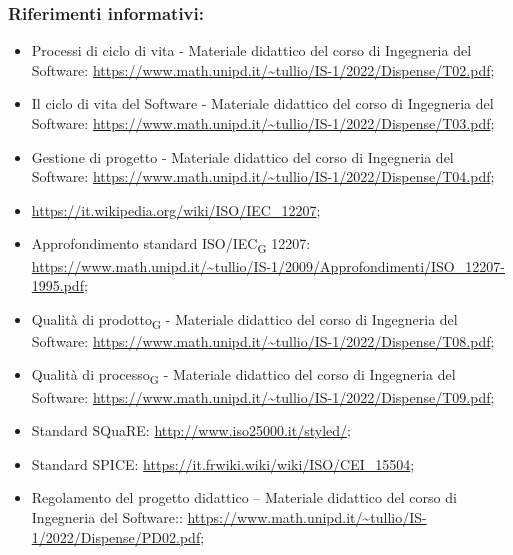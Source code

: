\subsubsection{Riferimenti informativi:}\:
\begin{itemize}
	\item Processi di ciclo di vita - Materiale didattico del corso di Ingegneria del Software: \url{https://www.math.unipd.it/~tullio/IS-1/2022/Dispense/T02.pdf};
	\item Il ciclo di vita del Software - Materiale didattico del corso di Ingegneria del Software: \url{https://www.math.unipd.it/~tullio/IS-1/2022/Dispense/T03.pdf};
	\item Gestione di progetto - Materiale didattico del corso di Ingegneria del Software: \url{https://www.math.unipd.it/~tullio/IS-1/2022/Dispense/T04.pdf};
	\item \url{https://it.wikipedia.org/wiki/ISO/IEC_12207};
	\item Approfondimento standard ISO/IEC\textsubscript{G} 12207:  \url{https://www.math.unipd.it/~tullio/IS-1/2009/Approfondimenti/ISO_12207-1995.pdf};
	\item Qualità di prodotto\textsubscript{G} - Materiale didattico del corso di Ingegneria del Software: \url{https://www.math.unipd.it/~tullio/IS-1/2022/Dispense/T08.pdf};
	\item Qualità di processo\textsubscript{G} - Materiale didattico del corso di Ingegneria del Software: \url{https://www.math.unipd.it/~tullio/IS-1/2022/Dispense/T09.pdf};
	\item Standard SQuaRE: \url{http://www.iso25000.it/styled/};
	\item Standard SPICE: \url{https://it.frwiki.wiki/wiki/ISO/CEI_15504};
	\item Regolamento del progetto didattico – Materiale didattico del corso di Ingegneria del Software::
	\url{https://www.math.unipd.it/~tullio/IS-1/2022/Dispense/PD02.pdf};
\end{itemize}
